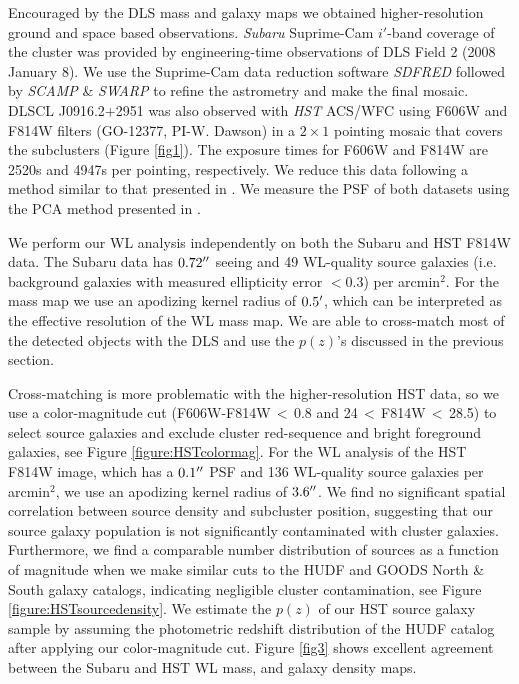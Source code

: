 Encouraged by the DLS mass and galaxy maps we obtained higher-resolution ground and space based observations.
{\it Subaru} Suprime-Cam $i'$-band coverage of the cluster was provided by engineering-time observations of DLS Field 2 (2008 January 8).
We use the Suprime-Cam data reduction software \emph{SDFRED} \citep{Yagi:2002ed,Ouchi:2004da} followed by \emph{SCAMP} \& \emph{SWARP} \citep{Bertin:2002wn,Bertin:2006vk} to refine the astrometry and make the final mosaic. 
DLSCL J0916.2+2951 was also observed with {\it HST} ACS/WFC using F606W and F814W filters (GO-12377, PI-W. Dawson) in a $2\times1$ pointing mosaic that covers the subclusters (Figure \ref{fig1}). 
The exposure times for F606W and F814W are 2520s and 4947s per pointing, respectively.  
We reduce this data following a method similar to that presented in \citet{Jee:2009cr}.  
We measure the PSF of both datasets using the PCA method presented in \citet{Jee:2007bq}.

We perform our WL analysis independently on both the Subaru and HST F814W data. The Subaru data has $0.72\mbox{$^{\prime\prime}$}$ seeing and 49 WL-quality source galaxies (i.e.\,background galaxies with measured ellipticity error  $<0.3$) per arcmin$^2$. For the mass map we use an apodizing kernel radius of $0.5\mbox{$^\prime$}$, which can be interpreted as the effective resolution of the WL mass map.
We are able to cross-match most of the detected objects with the DLS and use the $p(z)$'s discussed in the previous section.

Cross-matching is more problematic with the higher-resolution HST data, so we use a color-magnitude cut (F606W-F814W\,$<$\,0.8 and 24\,$<$\,F814W\,$<$\,28.5) to select source galaxies and exclude cluster red-sequence and bright foreground galaxies, see Figure \ref{figure:HSTcolormag}.
For the WL analysis of the HST F814W image, which has a $0.1\mbox{$^{\prime\prime}$}$ PSF and 136 WL-quality source galaxies per arcmin$^{2}$, we use an  apodizing kernel radius of $3.6\mbox{$^{\prime\prime}$}$.
We find no significant spatial correlation between source density and subcluster position, suggesting that our source galaxy population is not significantly contaminated with cluster galaxies.
Furthermore, we find a comparable number distribution of sources as a function of magnitude when we make similar cuts to the HUDF \citep{Coe:2006jf} and GOODS North \& South \citep{Giavalisco:2004kl} galaxy catalogs, indicating negligible cluster contamination, see Figure \ref{figure:HSTsourcedensity}.
We estimate the $p(z)$ of our HST source galaxy sample by assuming the photometric redshift distribution of the \citet{Coe:2006jf} HUDF catalog after applying our color-magnitude cut.
Figure \ref{fig3} shows excellent agreement between the Subaru and HST WL mass, and galaxy density maps.

